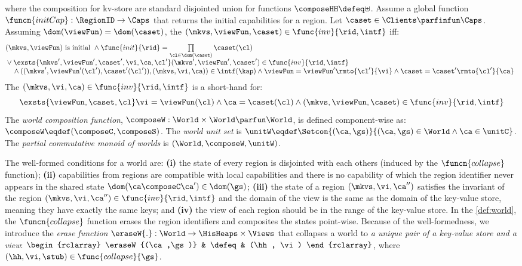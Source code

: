 \begin{definition}[Worlds]
\[\] 
where the composition for kv-store are standard disjointed union for functions \( \composeHH \defeq \uplus\).
Assume a global function \( \funcn{initCap} : \RegionID \to \Caps \) that returns the initial capabilities for a region.
Let \( \caset \in \Clients \parfinfun \Caps \).
Assuming \( \dom(\viewFun) = \dom(\caset) \), the \( ( \mkvs, \viewFun, \caset ) \in \func{inv}{\rid, \intf} \) iff:
\[
\begin{array}[t]{@{}l}
    (\mkvs, \viewFun) \text{ is initial }
    \land \func{init}{\rid}  = \prod\limits_{\cl \in \dom(\caset)} \caset(\cl) \\
    {} \lor \exsts{\mkvs', \viewFun', \caset', \vi, \ca, \cl'} 
    ( \mkvs' , \viewFun', \caset' ) \in \func{inv}{\rid, \intf} \\
    \quad {} \land (( \mkvs' , \viewFun'(\cl'), \caset'(\cl') ), ( \mkvs, \vi, \ca )) \in \intf(\kap) 
    \land \viewFun = \viewFun'\rmto{\cl'}{\vi}
    \land \caset = \caset'\rmto{\cl'}{\ca}
\end{array}
\]
The \( ( \mkvs, \vi, \ca ) \in \func{inv}{\rid, \intf} \) is a short-hand for:
\[ 
\exsts{\viewFun, \caset, \cl} \vi = \viewFun(\cl)  \land \ca = \caset(\cl) \land ( \mkvs, \viewFun, \caset ) \in \func{inv}{\rid, \intf}
\]
% 
The \emph{world composition function}, $\composeW: \World \times \World \parfun \World$, is defined component-wise as: $\composeW \eqdef (\composeC, \composeS)$.
The \emph{world unit set} is $\unitW \eqdef \Setcon{(\ca, \gs)}{(\ca, \gs) \in \World \land \ca \in \unitC}$.
The \emph{partial commutative monoid of worlds} is $(\World, \composeW, \unitW)$.
\end{definition}

The well-formed conditions for a world are:
\textbf{(i)} the state of every region is disjointed with each others (induced by the \(\funcn{collapse}\) function);
\textbf{(ii)} capabilities from regions are compatible with local capabilities and there is no capability of which the region identifier never appears in the shared state \ie \( \dom(\ca \composeC \ca') \in \dom(\gs) \); 
\textbf{(iii)} the state of a region \( (\mkvs, \vi, \ca'') \) satisfies the invariant of the region \( (\mkvs, \vi, \ca'') \in \func{inv}{\rid, \intf}\) and the domain of the view is the same as the domain of the key-value store, meaning they have exactly the same keys;
and \textbf{(iv)} the view of each region should be in the range of the key-value store.
In the \cref{def:world}, the \( \funcn{collapse} \) function erases the region identifiers and composites the states point-wise.
Because of the well-formedness, we introduce the \emph{erase function} \( \eraseW{.} : \World \to \HisHeaps \times \Views \) that collapses a world to \emph{a unique pair of a key-value store and a view}:
\(
\begin{rclarray}
    \eraseW{(\ca,\gs)} & \defeq & (\hh, \vi)
\end{rclarray}
\),
where \( (\hh, \vi, \stub) \in \func{collapse}{\gs} \).

